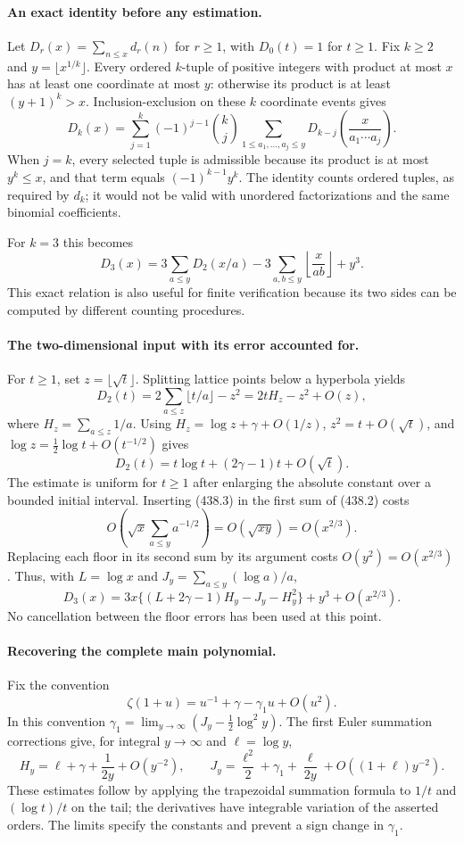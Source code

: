 \documentclass[11pt]{article}
\begin{document}
\paragraph{An exact identity before any estimation.}
Let $D_r(x)=\sum_{n\le x}d_r(n)$ for $r\ge1$, with $D_0(t)=1$ for $t\ge1$. Fix $k\ge2$ and $y=\lfloor x^{1/k}\rfloor$. Every ordered $k$-tuple of positive integers with product at most $x$ has at least one coordinate at most $y$: otherwise its product is at least $(y+1)^k>x$. Inclusion-exclusion on these $k$ coordinate events gives
\[
 D_k(x)=\sum_{j=1}^k(-1)^{j-1}\binom kj
 \sum_{1\le a_1,\ldots,a_j\le y}
 D_{k-j}\!\left(\frac{x}{a_1\cdots a_j}\right).
 \tag{438.1}
\]
When $j=k$, every selected tuple is admissible because its product is at most $y^k\le x$, and that term equals $(-1)^{k-1}y^k$. The identity counts ordered tuples, as required by $d_k$; it would not be valid with unordered factorizations and the same binomial coefficients.

For $k=3$ this becomes
\[
 D_3(x)=3\sum_{a\le y}D_2(x/a)
       -3\sum_{a,b\le y}\left\lfloor\frac{x}{ab}\right\rfloor+y^3.
 \tag{438.2}
\]
This exact relation is also useful for finite verification because its two sides can be computed by different counting procedures.

\paragraph{The two-dimensional input with its error accounted for.}
For $t\ge1$, set $z=\lfloor\sqrt t\rfloor$. Splitting lattice points below a hyperbola yields
\[
 D_2(t)=2\sum_{a\le z}\lfloor t/a\rfloor-z^2
       =2tH_z-z^2+O(z),
\]
where $H_z=\sum_{a\le z}1/a$. Using $H_z=\log z+\gamma+O(1/z)$, $z^2=t+O(\sqrt t)$, and $\log z=\tfrac12\log t+O(t^{-1/2})$ gives
\[
 D_2(t)=t\log t+(2\gamma-1)t+O(\sqrt t).
 \tag{438.3}
\]
The estimate is uniform for $t\ge1$ after enlarging the absolute constant over a bounded initial interval. Inserting (438.3) in the first sum of (438.2) costs
\[
 O\!\left(\sqrt x\sum_{a\le y}a^{-1/2}\right)
 =O(\sqrt{xy})=O(x^{2/3}).
\]
Replacing each floor in its second sum by its argument costs $O(y^2)=O(x^{2/3})$. Thus, with $L=\log x$ and $J_y=\sum_{a\le y}(\log a)/a$,
\[
 D_3(x)=3x\{(L+2\gamma-1)H_y-J_y-H_y^2\}+y^3+O(x^{2/3}).
 \tag{438.4}
\]
No cancellation between the floor errors has been used at this point.

\paragraph{Recovering the complete main polynomial.}
Fix the convention
\[
 \zeta(1+u)=u^{-1}+\gamma-\gamma_1u+O(u^2).
\]
In this convention $\gamma_1=\lim_{y\to\infty}(J_y-\tfrac12\log^2y)$. The first Euler summation corrections give, for integral $y\to\infty$ and $\ell=\log y$,
\[
 H_y=\ell+\gamma+\frac1{2y}+O(y^{-2}),\qquad
 J_y=\frac{\ell^2}{2}+\gamma_1+\frac{\ell}{2y}
                   +O((1+\ell)y^{-2}).
 \tag{438.5}
\]
These estimates follow by applying the trapezoidal summation formula to $1/t$ and $(\log t)/t$ on the tail; the derivatives have integrable variation of the asserted orders. The limits specify the constants and prevent a sign change in $\gamma_1$.
\end{document}
